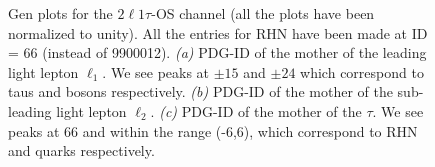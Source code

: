\documentclass[letterpaper,12pt]{article}
\begin{document}
\vspace{0.7cm}
\begin{figure}[h]
\centering
{}%
\quad
{}%
\quad
{}%
\quad

\caption[Gen plots for \2l1t-OS]{Gen plots for the $2\ell1\tau$-OS channel (all the plots have been normalized to unity). All the entries for RHN have been made at ID = 66 (instead of 9900012). \emph{(a)} PDG-ID of the mother of the leading light lepton $\ell_{1}$. We see peaks at $\pm15$ and $\pm24$ which correspond to taus and \Wboson{} bosons respectively. \emph{(b)} PDG-ID of the mother of the sub-leading light lepton $\ell_{2}$. \emph{(c)} PDG-ID of the mother of the $\tau$. We see peaks at 66 and within the range (-6,6), which correspond to RHN and quarks respectively.}

\label{fig:2l1tOSgen}  
\end{figure}

\vspace{0.7cm}
\end{document}
